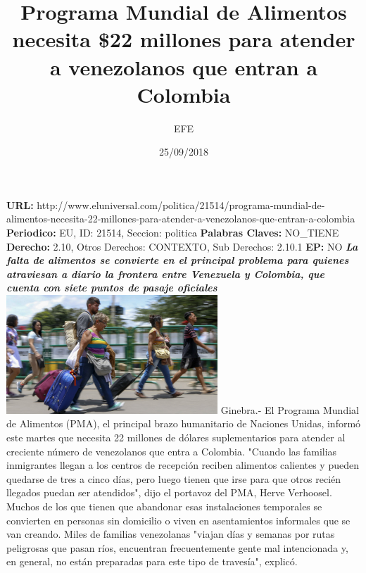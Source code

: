 \documentclass{article}%
\title{\textbf{Programa Mundial de Alimentos necesita \$22 millones para atender a venezolanos que entran a Colombia}}%
\author{EFE}%
\date{25/09/2018}%
\begin{document}
%
\normalsize%
\maketitle%
\textbf{URL: }%
http://www.eluniversal.com/politica/21514/programa{-}mundial{-}de{-}alimentos{-}necesita{-}22{-}millones{-}para{-}atender{-}a{-}venezolanos{-}que{-}entran{-}a{-}colombia\newline%
%
\textbf{Periodico: }%
EU, %
ID: %
21514, %
Seccion: %
politica\newline%
%
\textbf{Palabras Claves: }%
NO\_TIENE\newline%
%
\textbf{Derecho: }%
2.10, %
Otros Derechos: %
CONTEXTO, %
Sub Derechos: %
2.10.1\newline%
%
\textbf{EP: }%
NO\newline%
\newline%
%
\textbf{\textit{La falta de alimentos se convierte en el principal problema para quienes atraviesan a diario la frontera entre Venezuela y Colombia, que cuenta con siete puntos de pasaje oficiales}}%
\newline%
\newline%
%
\includegraphics[width=300px]{251.jpg}%
\newline%
%
Ginebra.{-} El Programa Mundial de Alimentos (PMA), el principal brazo humanitario de Naciones Unidas, informó este martes que necesita 22 millones de dólares suplementarios para atender al creciente número de venezolanos que entra a Colombia.%
\newline%
%
"Cuando las familias inmigrantes llegan a los centros de recepción reciben alimentos calientes y pueden quedarse de tres a cinco días, pero luego tienen que irse para que otros recién llegados puedan ser atendidos", dijo el portavoz del PMA, Herve Verhoosel.%
\newline%
%
Muchos de los que tienen que abandonar esas instalaciones temporales se convierten en personas sin domicilio o viven en asentamientos informales que se van creando.%
\newline%
%
Miles de familias venezolanas "viajan días y semanas por rutas peligrosas que pasan ríos, encuentran frecuentemente gente mal intencionada y, en general, no están preparadas para este tipo de travesía", explicó.%
\end{document}
